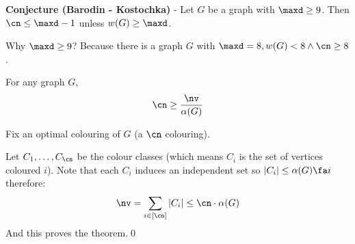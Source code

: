 \noindent\textbf{Conjecture (Barodin - Kostochka)} - Let $G$ be a graph with $\maxd \geq 9$. Then $\cn \leq \maxd - 1$ unless $w(G) \geq \maxd$.

Why $\maxd \geq 9$? Because there is a graph $G$ with $\maxd = 8, w(G) < 8 \land \cn \geq 8$.

\begin{customlemma}{6.8}
\label{lemma:6.8}
    For any graph $G$,
    \begin{equation*}
        \cn \geq \frac{\nv}{\alpha(G)}
    \end{equation*}
\end{customlemma}
\begin{prf}
    Fix an optimal colouring of $G$ (a $\cn$ colouring).

    Let $C_1, \dots, C_{\cn}$ be the colour classes (which means $C_i$ is the set of vertices coloured $i$). Note that each $C_i$ induces an independent set so $|C_i| \leq \alpha(G) \fa i$ therefore:
    \begin{equation*}
        \nv = \sum_{i \in [\cn]}|C_i| \leq \cn \cdot \alpha(G)
    \end{equation*}
    And this proves the theorem.\qed
\end{prf}

